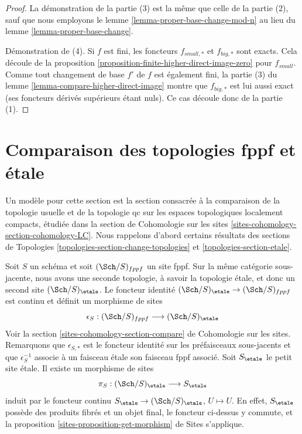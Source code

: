 \begin{proof}
\medskip\noindent
La démonstration de la partie (3) est la même que celle de la partie (2), sauf que
nous employons le lemme \ref{lemma-proper-base-change-mod-n}
au lieu du lemme \ref{lemma-proper-base-change}.

\medskip\noindent
Démonstration de (4). Si $f$ est fini, les foncteurs
$f_{small, *}$ et $f_{big, *}$ sont exacts. Cela découle
de la proposition \ref{proposition-finite-higher-direct-image-zero}
pour $f_{small}$. Comme tout changement de base $f'$ de $f$ est également fini,
la partie (3) du lemme \ref{lemma-compare-higher-direct-image} montre
que $f_{big, *}$ est lui aussi exact (ses foncteurs dérivés supérieurs étant nuls).
Ce cas découle donc de la partie (1).
\end{proof}




\section{Comparaison des topologies fppf et étale}
\label{section-fppf-etale}

\noindent
Un modèle pour cette section est la section consacrée à la comparaison de la
topologie usuelle et de la topologie qc sur les espaces topologiques
localement compacts, étudiée dans la section de Cohomologie sur les sites
\ref{sites-cohomology-section-cohomology-LC}.
Nous rappelons d'abord certains résultats des
sections de Topologies
\ref{topologies-section-change-topologies} et
\ref{topologies-section-etale}.

\medskip\noindent
Soit $S$ un schéma et soit $(\Sch/S)_{fppf}$ un site fppf.
Sur la même catégorie sous-jacente, nous avons une seconde topologie,
à savoir la topologie étale, et donc un second site
$(\Sch/S)_\etale$. Le foncteur identité
$(\Sch/S)_\etale \to (\Sch/S)_{fppf}$ est continu et définit
un morphisme de sites
$$
\epsilon_S : (\Sch/S)_{fppf} \longrightarrow (\Sch/S)_\etale
$$
Voir la section \ref{sites-cohomology-section-compare} de Cohomologie sur les sites.
Remarquons que $\epsilon_{S, *}$ est le foncteur identité sur les
préfaisceaux sous-jacents et que $\epsilon_S^{-1}$ associe à un faisceau étale son
faisceau fppf associé. Soit $S_\etale$ le petit site étale.
Il existe un morphisme de sites
$$
\pi_S : (\Sch/S)_\etale \longrightarrow S_\etale
$$
induit par le foncteur continu
$S_\etale \to (\Sch/S)_\etale$, $U \mapsto U$.
En effet, $S_\etale$ possède des produits fibrés et un objet final, le
foncteur ci-dessus y commute, et la
proposition \ref{sites-proposition-get-morphism} de Sites s'applique.


